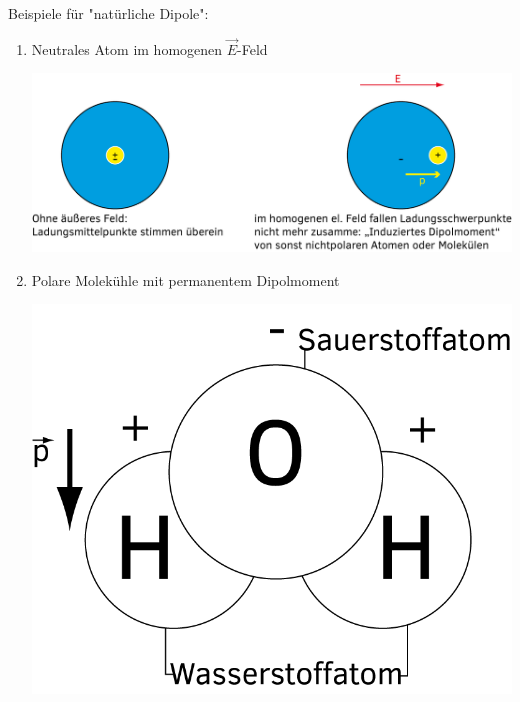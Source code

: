 \documentclass[11pt]{article}
\begin{document}
	\begin{minipage}{\textwidth}
	
		Beispiele für "natürliche Dipole": \\
		\begin{enumerate}
			\item Neutrales Atom im homogenen $ \vec{E} $-Feld  
			\begin{center}
				\includegraphics[width=0.9\linewidth]{skizzen/14/14_4B3}
			\end{center}
	
			\item Polare Molekühle mit permanentem Dipolmoment
			\begin{center}
				\includegraphics[width=0.4\linewidth]{skizzen/14/14_4B4}
			\end{center}
		
		\end{enumerate}
	
	\end{minipage}
	
\end{document}
